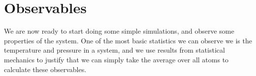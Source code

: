 \section{Observables}
%
% 
% 
%
%
%
%
We are now ready to start doing some simple simulations, and observe some properties of the system. One of the most basic statistics we can observe we is the temperature and pressure in a system, and we use results from statistical mechanics to justify that we can simply take the average over all atoms to calculate these observables.

